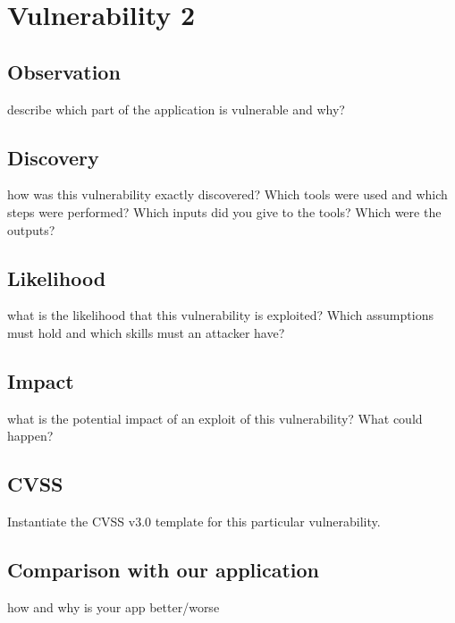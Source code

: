 \section{Vulnerability 2}
\subsection{Observation}
describe which part of the application is vulnerable and why?

\subsection{Discovery}
how was this vulnerability exactly discovered? Which tools were used and which
steps were performed? Which inputs did you give to the tools? Which were the outputs?

\subsection{Likelihood}
what is the likelihood that this vulnerability is exploited? Which assumptions must hold and which skills must an attacker have?

\subsection{Impact}
what is the potential impact of an exploit of this vulnerability? What could happen?

\subsection{CVSS}
Instantiate the CVSS v3.0 template for this particular vulnerability.

\subsection{Comparison with our application}
how and why is your app better/worse
\clearpage